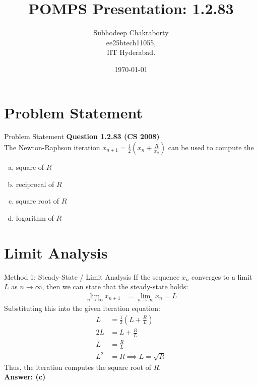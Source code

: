 \documentclass{beamer}
\title{POMPS Presentation: 1.2.83}
\author{Subhodeep Chakraborty \\ ee25btech11055,\\IIT Hyderabad.}
\date{\today}
\theoremstyle{remark}
\numberwithin{equation}{section}
\begin{document}
\begin{frame}
    \titlepage
\end{frame}
\begin{frame}
    \tableofcontents
\end{frame}


\section{Problem Statement}
\begin{frame}{Problem Statement}
    \textbf{Question 1.2.83 (CS 2008)} \\
        The Newton-Raphson iteration $x_{n+1} = \frac{1}{2}\left(x_n + \frac{R}{x_n}\right)$ can be used to compute the
        \begin{enumerate}[a)]
            \item square of $R$
            \item reciprocal of $R$
            \item square root of $R$
            \item logarithm of $R$
        \end{enumerate}
\end{frame}

\section{Limit Analysis}
\begin{frame}{Method 1: Steady-State / Limit Analysis}
    If the sequence $x_n$ converges to a limit $L$ as $n \to \infty$, then we can state that the steady-state holds:
    \begin{align}
        \lim_{n \to \infty} x_{n+1} &= \lim_{n \to \infty} x_n = L
    \end{align}
    Substituting this into the given iteration equation:
    \begin{align}
        L &= \frac{1}{2}\left(L + \frac{R}{L}\right) \\
        2L &= L + \frac{R}{L} \\
        L &= \frac{R}{L} \\
        L^2 &= R \implies L = \sqrt{R}
    \end{align}
    Thus, the iteration computes the square root of $R$. \\
    \textbf{Answer: (c)}
\end{frame}
\end{document}
